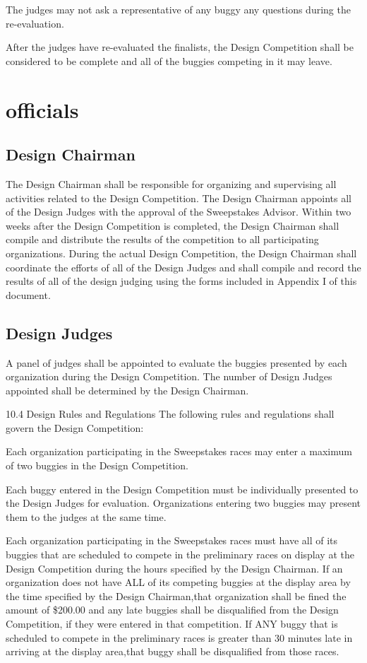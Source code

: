 The judges may not ask a representative of any buggy any questions during the re-evaluation.

After the judges have re-evaluated the finalists, the Design Competition shall be considered to be complete and all of the buggies competing in it may leave.

\section{officials}

\subsection{Design Chairman}

The Design Chairman shall be responsible for organizing and supervising all activities related to the Design Competition. The Design Chairman appoints all of the Design Judges with the approval of the Sweepstakes Advisor. Within two weeks after the Design Competition is completed, the Design Chairman shall compile and distribute the results of the competition to all participating organizations. During the actual Design Competition, the Design Chairman shall coordinate the efforts of all of the Design Judges and shall compile and record the results of all of the design judging using the forms included in Appendix I of this document.

\subsection{Design Judges}

A panel of judges shall be appointed to evaluate the buggies presented by each organization during the Design Competition. The number of Design Judges appointed shall be determined by the Design Chairman.

10.4 Design Rules and Regulations
The following rules and regulations shall govern the Design Competition:

Each organization participating in the Sweepstakes races may enter a maximum of two buggies in the Design Competition.

Each buggy entered in the Design Competition must be individually presented to the Design Judges for evaluation. Organizations entering two buggies may present them to the judges at the same time.

Each organization participating in the Sweepstakes races must have all of its buggies that are scheduled to compete in the preliminary races on display at the Design Competition during the hours specified by the Design Chairman. If an organization does not have ALL of its competing buggies at the display area by the time specified by the Design Chairman,that organization shall be fined the amount of \$200.00 and any late buggies shall be disqualified from the Design Competition, if they were entered in that competition. If ANY buggy that is scheduled to compete in the preliminary races is greater than 30 minutes late in arriving at the display area,that buggy shall be disqualified from those races.

